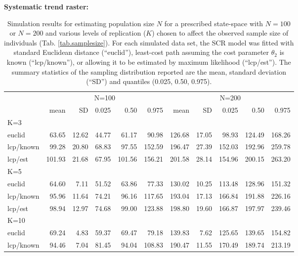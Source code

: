 \documentclass[12pt]{article}
\begin{document}
\clearpage

\newpage


\begin{table}[h!]
{\small
\caption{Simulation results for estimating population size $N$ for a prescribed state-space with
$N=100$ or $N=200$ and various levels of replication ($K$) chosen to affect the observed sample
size of individuals (Tab. \ref{tab.samplesize}). For each simulated data set, the SCR model was fitted with
standard Euclidean distance (``euclid''), least-cost path assuming the
cost parameter $\theta_2$ is known (``lcp/known''), or allowing it to
be estimated by maximum likelihood (``lcp/est'').
The summary statistics of the
sampling distribution reported are the mean, standard deviation
(``SD'') and quantiles (0.025, 0.50, 0.975).
}
{\bf Systematic trend raster:} \\
\begin{tabular}{l|rrrrr|rrrrr}
         & \multicolumn{5}{c}{N=100   } & \multicolumn{5}{c}{N=200  }  \\
         &   mean &  SD  & 0.025 & 0.50 & 0.975  & mean  & SD   & 0.025 & 0.50  & 0.975 \\ \hline
K=3      &        &      &       &      &        &       &      &       &       &       \\
euclid   &   63.65& 12.62& 44.77 & 61.17&  90.98 & 126.68& 17.05&  98.93& 124.49& 168.26 \\
lcp/known&   99.28& 20.80& 68.83 & 97.55& 152.59 & 196.47& 27.39& 152.03& 192.96& 259.78\\
lcp/est  &  101.93& 21.68& 67.95 &101.56& 156.21 & 201.58& 28.14& 154.96& 200.15& 263.20\\
K=5      &        &      &       &      &        &       &      &       &       &        \\
euclid   &  64.60 & 7.11 & 51.52 & 63.86&  77.33 & 130.02& 10.25& 113.48& 128.96& 151.32\\
lcp/known&  95.96 &11.64 & 74.21 & 96.16& 117.65 & 193.04& 17.13& 166.84& 191.88& 226.16\\
lcp/est  &  98.94 &12.97 & 74.68 & 99.00& 123.88 & 198.80& 19.60& 166.87& 197.97& 239.46\\
K=10     &        &      &       &      &        &       &      &       &       &       \\
euclid   &  69.24 & 4.83 & 59.37 & 69.47&  79.18 & 139.83&  7.62& 125.65& 139.65& 154.82\\
lcp/known&  94.46 & 7.04 & 81.45 & 94.04& 108.83 & 190.47& 11.55& 170.49& 189.74& 213.19\\

\end{tabular}}
\end{table}
\end{document}
